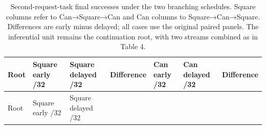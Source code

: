 \documentclass[10pt,letterpaper]{article}
\begin{document}
\begin{longtable}[]{@{}
  >{\raggedright\arraybackslash}p{}
  >{\raggedleft\arraybackslash}p{}
  >{\raggedleft\arraybackslash}p{}
  >{\raggedleft\arraybackslash}p{}
  >{\raggedleft\arraybackslash}p{}
  >{\raggedleft\arraybackslash}p{}
  >{\raggedleft\arraybackslash}p{}@{}}
\caption{Second-request-task final successes under the two branching
schedules. Square columns refer to Can→Square→Can and Can columns to
Square→Can→Square. Differences are early minus delayed; all cases use
the original paired panels. The inferential unit remains the
continuation root, with two streams combined as in Table
4.}\tabularnewline
\toprule\noalign{}
\begin{minipage}[b]{\linewidth}\raggedright
Root
\end{minipage} & \begin{minipage}[b]{\linewidth}\raggedleft
Square early /32
\end{minipage} & \begin{minipage}[b]{\linewidth}\raggedleft
Square delayed /32
\end{minipage} & \begin{minipage}[b]{\linewidth}\raggedleft
Difference
\end{minipage} & \begin{minipage}[b]{\linewidth}\raggedleft
Can early /32
\end{minipage} & \begin{minipage}[b]{\linewidth}\raggedleft
Can delayed /32
\end{minipage} & \begin{minipage}[b]{\linewidth}\raggedleft
Difference
\end{minipage} \\
\midrule\noalign{}
\endfirsthead
\toprule\noalign{}
\begin{minipage}[b]{\linewidth}\raggedright
Root
\end{minipage} & \begin{minipage}[b]{\linewidth}\raggedleft
Square early /32
\end{minipage} & \begin{minipage}[b]{\linewidth}\raggedleft
Square delayed /32
\end{minipage} & \begin{minipage}[b]{\linewidth}\raggedleft

\end{minipage}
\end{longtable}
\end{document}
